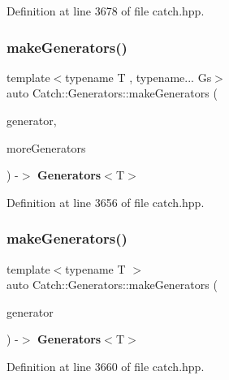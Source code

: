 Definition at line 3678 of file catch.\+hpp.

\mbox{\label{namespace_catch_1_1_generators_adabbca9c7049bd8b5dd0474240108485}} 
\subsubsection{makeGenerators()\hspace{0.1cm}{\footnotesize\ttfamily [1/4]}}
{\footnotesize\ttfamily template$<$typename T , typename... Gs$>$ \\
auto Catch\+::\+Generators\+::make\+Generators (\begin{DoxyParamCaption}\item[{\textbf{ Generator\+Wrapper}$<$ T $>$ \&\&}]{generator,  }\item[{Gs...}]{more\+Generators }\end{DoxyParamCaption}) -\/$>$ \textbf{ Generators}$<$T$>$ }



Definition at line 3656 of file catch.\+hpp.

\mbox{\label{namespace_catch_1_1_generators_abefb1a0fab3c669b98a53037b3286d22}} 
\subsubsection{makeGenerators()\hspace{0.1cm}{\footnotesize\ttfamily [2/4]}}
{\footnotesize\ttfamily template$<$typename T $>$ \\
auto Catch\+::\+Generators\+::make\+Generators (\begin{DoxyParamCaption}\item[{\textbf{ Generator\+Wrapper}$<$ T $>$ \&\&}]{generator }\end{DoxyParamCaption}) -\/$>$ \textbf{ Generators}$<$T$>$ }



Definition at line 3660 of file catch.\+hpp.

\mbox{\label{namespace_catch_1_1_generators_a0497b4463b7afee28df49631d6d75e83}} 
